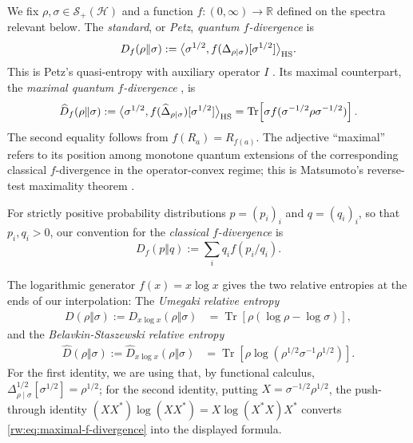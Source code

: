 \documentclass[11pt]{article}
\theoremstyle{remark}
\newcommand{\1}{\mathbbm{1}}
\begin{document}
We fix $\rho,\sigma\in\mathcal S_{+}(\mathcal H)$ and a function
$f:(0,\infty)\to\mathbb R$ defined on the spectra relevant below.
The \textit{standard}, or \textit{Petz}, \textit{quantum $f$-divergence} \cite{hiai2017different} is
\begin{equation}
 D_f(\rho\Vert\sigma)
 :=\big\langle\sigma^{1/2},
 f(\Delta_{\rho\mid\sigma})[\sigma^{1/2}]
 \big\rangle_{\rm HS}.
 \label{rw:eq:standard-f-divergence}
\end{equation}
This is Petz's quasi-entropy with auxiliary operator $I$
\cite{petz1986quasi,hiai2012quasi}.  Its maximal counterpart, the
\textit{maximal quantum $f$-divergence}
\cite[Definition~3.21]{hiai2017different}, is
\begin{equation}
 \begin{aligned}
 \widehat D_f(\rho\Vert\sigma)
 :=\big\langle\sigma^{1/2},
 f(\widehat\Delta_{\rho\mid\sigma})[\sigma^{1/2}]
 \big\rangle_{\rm HS}=\operatorname{Tr}\!\left[
 \sigma f(\sigma^{-1/2}\rho\sigma^{-1/2})\right].
 \end{aligned}
 \label{rw:eq:maximal-f-divergence}
\end{equation}
The second equality follows from
$f(R_a)=R_{f(a)}$.  The adjective ``maximal'' refers to its position
among monotone quantum extensions of the corresponding classical
$f$-divergence in the operator-convex regime; this is Matsumoto's
reverse-test maximality theorem \cite[Lemma~3.1]{matsumoto2018new}.

For strictly positive probability distributions $p=(p_i)_i$ and $q=(q_i)_i$,
so that $p_i,q_i>0$, our convention for the \textit{classical $f$-divergence} is
\begin{equation}
 D_f(p\Vert q):=\sum_i q_i f(p_i/q_i).
 \label{rw:eq:classical-f-divergence}
\end{equation}

The logarithmic generator $f(x)=x\log x$ gives the two relative
entropies at the ends of our interpolation: The \textit{Umegaki relative entropy} \cite{Umegaki-RelativeEntropy-1962}
\begin{equation}
 \begin{aligned}
 D(\rho\Vert\sigma)
 :=D_{x\log x}(\rho\Vert\sigma)
 &=\operatorname{Tr}\!\left[\rho(\log\rho-\log\sigma)\right],
 \end{aligned}
 \label{rw:eq:Umegaki-relative-entropies}
\end{equation}
and the \textit{Belavkin-Staszewski relative entropy} \cite{BelavkinStaszewski-BSentropy-1982}
\begin{equation}
 \begin{aligned}
 \widehat D(\rho\Vert\sigma)
 :=\widehat D_{x\log x}(\rho\Vert\sigma)
 &=\operatorname{Tr}\!\left[
 \rho\log(\rho^{1/2}\sigma^{-1}\rho^{1/2})\right].
 \end{aligned}
 \label{rw:eq:Belavkin-Stasszewski-relative-entropies}
\end{equation}
For the first identity, we are using that, by functional calculus,
$\Delta_{\rho\mid\sigma}^{1/2}[\sigma^{1/2}]=\rho^{1/2}$;
for the second identity, putting
$X=\sigma^{-1/2}\rho^{1/2}$, the push-through identity
$(XX^*)\log(XX^*)=X\log(X^*X)X^*$ converts
\eqref{rw:eq:maximal-f-divergence} into the displayed formula.  
\end{document}
